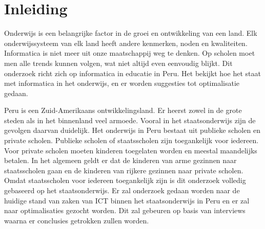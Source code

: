 \chapter{Inleiding}
\label{ch:inleiding}

Onderwijs is een belangrijke factor in de groei en ontwikkeling van een land. Elk onderwijssysteem van elk land heeft andere kenmerken, noden en kwaliteiten. Informatica is niet meer uit onze maatschappij weg te denken. Op scholen moet men alle trends kunnen volgen, wat niet altijd even eenvoudig blijkt. Dit onderzoek richt zich op informatica in educatie in Peru. Het bekijkt hoe het staat met informatica in het onderwijs, en er worden suggesties tot optimalisatie gedaan.

Peru is een Zuid-Amerikaans ontwikkelingsland. Er heerst zowel in de grote steden als in het binnenland veel armoede. Vooral in het staatsonderwijs zijn de gevolgen daarvan duidelijk. Het onderwijs in Peru bestaat uit publieke scholen en private scholen. Publieke scholen of staatsscholen zijn toegankelijk voor iedereen. Voor private scholen moeten kinderen toegelaten worden en meestal maandelijks betalen. In het algemeen geldt er dat de kinderen van arme gezinnen naar staatsscholen gaan en de kinderen van rijkere gezinnen naar private scholen. Omdat staatsscholen voor iedereen toegankelijk zijn is dit onderzoek volledig gebaseerd op het staatsonderwijs. Er zal onderzoek gedaan worden naar de huidige stand van zaken van ICT binnen het staatsonderwijs in Peru en er zal naar optimalisaties gezocht worden. Dit zal gebeuren op basis van interviews waarna er conclusies getrokken zullen worden.



